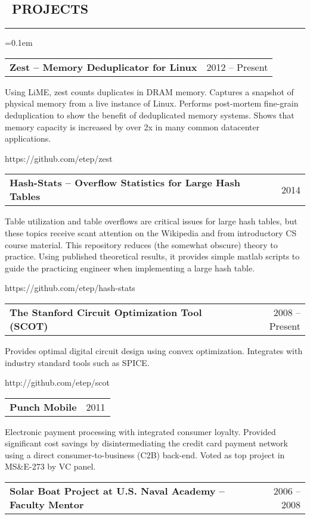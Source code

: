 \documentclass[10pt,letterpaper]{article}
\makeatletter
\newenvironment{changemargin}[2]
{%
    \begin{list}{}{%
        \setlength{\topsep}{0pt}%
        \setlength{\leftmargin}{#1}%
        \setlength{\rightmargin}{#2}%
        \setlength{\listparindent}{\parindent}%
        \setlength{\itemindent}{\parindent}%
        \setlength{\parsep}{\parskip}%
    }%
    \item[]
}%
{%
    \end{list}
}%
\newenvironment{content}
{%
    \begin{changemargin}{0cm}{2.5cm}
    \begin{itemize*}
        \vspace{-0.15em}
}%
{%
    \end{itemize*}
    \end{changemargin}
}%
\newenvironment{resumesection}[1]
{%
    \subsection*{\ #1}
    \vspace{-0.4em}
    \hrule
    \vspace{+0.4em}
    \begin{itemize}
        \parskip=0.1em
}%
{%
    \end{itemize}
}%
\newcommand{\headerrowx}[2]
{\item[] \begin{tabular*}{\linewidth}{l@{\extracolsep{\fill}}r}
	#1 &
	#2 \\
\end{tabular*}}
\makeatother
\begin{document}
\begin{resumesection}{PROJECTS}
    \headerrowx{ \textbf{Zest -- Memory Deduplicator for Linux}} {2012 -- Present}
    \begin{content}
        \item[] Using LiME, zest counts duplicates in DRAM memory.
                Captures a snapshot of physical memory from a live instance of Linux.
                Performs post-mortem fine-grain deduplication to show the benefit of deduplicated memory systems.
                Shows that memory capacity is increased by over 2x in many common datacenter applications.
        \item[] https://github.com/etep/zest
    \end{content}
    \headerrowx{ \textbf{Hash-Stats -- Overflow Statistics for Large Hash Tables}} {2014}
    \begin{content}
        \item[] Table utilization and table overflows are critical issues for large hash tables,
                but these topics receive scant attention on the Wikipedia and from introductory CS course material.
                This repository reduces (the somewhat obscure) theory to practice.
                Using published theoretical results, it provides simple matlab scripts to guide the practicing engineer when implementing a large hash table.
        \item[] https://github.com/etep/hash-stats
    \end{content}
    \headerrowx{ \textbf{The Stanford Circuit Optimization Tool (SCOT)}} {2008 -- Present}
    \begin{content}
        \item[] Provides optimal digital circuit design using convex optimization.
                Integrates with industry standard tools such as SPICE.
        \item[] http://github.com/etep/scot
    \end{content}
    \headerrowx{ \textbf{Punch Mobile}} {2011}
    \begin{content}
        \item[] Electronic payment processing with integrated consumer loyalty.
                Provided significant cost savings by disintermediating the credit card payment network using a direct consumer-to-business (C2B) back-end.
                Voted as top project in MS\&E-273 by VC panel.
    \end{content}
    \headerrowx{ \textbf{Solar Boat Project at U.S. Naval Academy -- Faculty Mentor}} {2006 -- 2008}

\end{resumesection}
\end{document}
